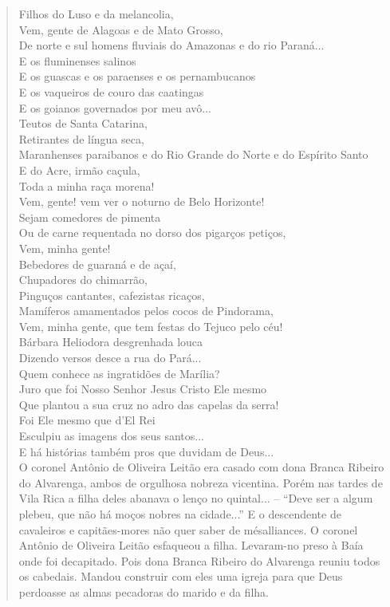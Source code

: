 \begin{verse}
Filhos do Luso e da melancolia,\\
Vem, gente de Alagoas e de Mato Grosso,\\
De norte e sul homens fluviais do Amazonas e do rio Paraná...\\
E os fluminenses salinos\\
E os guascas e os paraenses e os pernambucanos\\
E os vaqueiros de couro das caatingas\\
E os goianos governados por meu avô...\\
Teutos de Santa Catarina,\\
Retirantes de língua seca,\\
Maranhenses paraibanos e do Rio Grande do Norte e do Espírito Santo\\
E do Acre, irmão caçula,\\
Toda a minha raça morena!\\
Vem, gente! vem ver o noturno de Belo Horizonte!\\
Sejam comedores de pimenta\\
Ou de carne requentada no dorso dos pigarços petiços,\\
Vem, minha gente!\\
Bebedores de guaraná e de açaí,\\
Chupadores do chimarrão,\\
Pinguços cantantes, cafezistas ricaços,\\
Mamíferos amamentados pelos cocos de Pindorama,\\
Vem, minha gente, que tem festas do Tejuco pelo céu!\\
Bárbara Heliodora desgrenhada louca\\
Dizendo versos desce a rua do Pará...\\
Quem conhece as ingratidões de Marília?\\
Juro que foi Nosso Senhor Jesus Cristo Ele mesmo\\
Que plantou a sua cruz no adro das capelas da serra!\\
Foi Ele mesmo que d'El Rei\\
Esculpiu as imagens dos seus santos...\\
E há histórias também pros que duvidam de Deus...\\

O coronel Antônio de Oliveira Leitão era casado com dona Branca Ribeiro
do Alvarenga, ambos de orgulhosa nobreza vicentina. Porém nas tardes de
Vila Rica a filha deles abanava o lenço no quintal... -- ``Deve ser a
algum plebeu, que não há moços nobres na cidade...'' E o descendente de
cavaleiros e capitães-mores não quer saber de mésalliances. O coronel
Antônio de Oliveira Leitão esfaqueou a filha. Levaram-no preso à Baía
onde foi decapitado. Pois dona Branca Ribeiro do Alvarenga reuniu todos
os cabedais. Mandou construir com eles uma igreja para que Deus
perdoasse as almas pecadoras do marido e da filha.


\end{verse}

